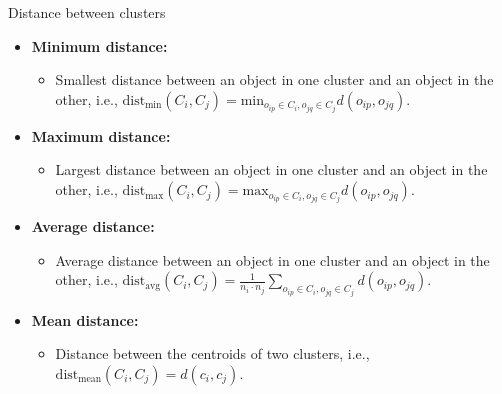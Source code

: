 \documentclass[aspectratio=169,t,xcolor=dvipsnames]{beamer}
\begin{document}
  { %
    \begin{frame}{Distance between clusters}
      \begin{itemize}
        \item \textbf{Minimum distance:}
        \begin{itemize}
          \item Smallest distance between an object in one cluster and an object in the other, i.e., $\text{dist}_{\text{min}} (C_i, C_j) = \text{min}_{o_{ip} \in C_i, o_{jq} \in C_j} d(o_{ip}, o_{jq})$.
        \end{itemize}
        \item \textbf{Maximum distance:}
        \begin{itemize}
          \item Largest distance between an object in one cluster and an object in the other, i.e., $\text{dist}_\text{max}(C_i, C_j) = \text{max}_{o_{ip} \in C_i, o_{jq} \in C_j} d(o_{ip}, o_{jq}).$
        \end{itemize}
        \item \textbf{Average distance:}
        \begin{itemize}
          \item Average distance between an object in one cluster and an object in the other, i.e., $\text{dist}_{\text{avg}} (C_i, C_j) = \frac{1}{n_i \cdot n_j} \sum_{o_{ip} \in C_i, o_{jq} \in C_j} d(o_{ip}, o_{jq}).$
        \end{itemize}
        \item \textbf{Mean distance:}
        \begin{itemize}
          \item Distance between the centroids of two clusters, i.e., $\text{dist}_{\text{mean}} (C_i, C_j) = d(c_i, c_j).$
        \end{itemize}
      \end{itemize}
    \end{frame}
  }
\end{document}
